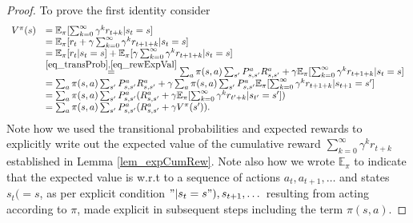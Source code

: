 \documentclass[11pt]{article} %
\begin{document}
\begin{proof}
	To prove the first identity consider
	\[
		\begin{array}{rl}
			V^{\pi}(s)		& = \mathbb{E}_{\pi}[ \sum_{k=0}^{\infty} \gamma^k r_{t+k} | s_t = s]  \\
						& = \mathbb{E}_{\pi}[r_t + \gamma \sum_{k=0}^{\infty} \gamma^k r_{t+1+k} | s_t = s]  \\
						& = \mathbb{E}_{\pi}[r_t | s_t = s] + \mathbb{E}_{\pi}[\gamma \sum_{k=0}^{\infty} \gamma^k r_{t+1+k} | s_t = s] \\
						& \overset{\ref{eq_transProb},\ref{eq_rewExpVal}}{=} \sum_a \pi(s,a) \sum_{s'} P_{s,s'}^a R_{s,s'}^a + \gamma \mathbb{E}_{\pi}[\sum_{k=0}^{\infty} \gamma^k r_{t+1+k} | s_t = s] \\
						& = \sum_a \pi(s,a) \sum_{s'} P_{s,s'}^a R_{s,s'}^a + \gamma \sum_a \pi(s,a) \sum_{s'} P_{s,s'}^a \mathbb{E}_{\pi} [\sum_{k=0}^{\infty} \gamma^k r_{t+1+k} | s_{t+1} = s'] \\
						& = \sum_a \pi(s,a) \sum_{s'} P_{s,s'}^a (R_{s,s'}^a + \gamma \mathbb{E}_{\pi}[\sum_{k=0}^{\infty} \gamma^k r_{t'+k} | s_{t'} = s'] ) \\
						& = \sum_a \pi(s,a) \sum_{s'} P_{s,s'}^a (R_{s,s'}^a + \gamma V^{\pi}(s') ).
		\end{array}
	\]
	Note how we used the transitional probabilities and expected rewards to explicitly write out the expected value of the cumulative reward $\sum_{k=0}		^{\infty} \gamma^k r_{t+k}$ established in Lemma \ref{lem_expCumRew}. Note also how we wrote $\mathbb{E}_{\pi}$ to indicate that the expected value is w.r.t to a sequence of actions $a_t, a_{t+1},\dots$ and states $s_t (=s$, as per explicit condition $"| s_t = s"),s_{t+1},\dots$ resulting from acting according to $\pi$, made explicit in subsequent steps including the term $\pi(s,a)$.


\end{proof}
\end{document}
